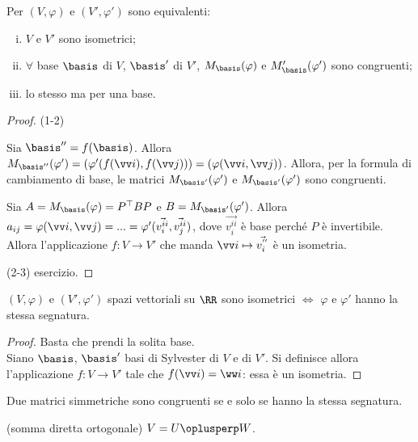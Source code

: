 \documentclass[11pt]{article}
\begin{document}
	\begin{proposition}
		Per $(V, \varphi)$ e $(V', \varphi')$ sono equivalenti:
		
		\begin{enumerate}[(i)]
			\item $V$ e $V'$ sono isometrici;
			\item $\forall$ base $\basis$ di $V$, $\basis'$ di $V'$,
			$M_\basis(\varphi)$ e $M_\basis'(\varphi')$ sono congruenti;
			\item lo stesso ma per una base.
		\end{enumerate}
	\end{proposition}

	\begin{proof}
		(1-2)
		
		 \rightproof Sia $\basis'' = f(\basis)$. Allora $M_{\basis''}(\varphi')=
		 (\varphi'(f(\vv i), f(\vv j))) = (\varphi(\vv i, \vv j))$. Allora,
		 per la formula di cambiamento di base, le matrici
		 $M_{\basis'}(\varphi')$ e $M_{\basis'}(\varphi')$ sono congruenti.
		 
		 \leftproof Sia $A = M_\basis(\varphi) = P^\top B P$ e
		 $B = M_{\basis'}(\varphi')$. Allora $a_{ij} = \varphi(\vv i, \vv j) =
		 ... = \varphi'(\vec{v_i^{ii}}, \vec{v_j^{ii}})$, dove
		 $\vec{v_i^{ii}}$ è base perché $P$ è invertibile. Allora
		 l'applicazione $f : V \to V'$ che manda $\vv i \mapsto \vec{v_{i}^{''}}$ è un isometria.
		 
		 (2-3) esercizio.
	\end{proof}

	\begin{proposition} $(V, \varphi)$ e $(V', \varphi')$ spazi vettoriali
		su $\RR$ sono
		isometrici $\iff$ $\varphi$ e $\varphi'$ hanno la stessa segnatura.
	\end{proposition}

	\begin{proof}
		\rightproof Basta che prendi la solita base. \\
		\leftproof Siano $\basis$, $\basis'$ basi di Sylvester di $V$
		e di $V'$. Si definisce allora l'applicazione $f : V \to V'$ tale
		che $f(\vv i) = \ww i$: essa è un isometria.
	\end{proof}

	\begin{corollary}
		Due matrici simmetriche sono congruenti se e solo se hanno
		la stessa segnatura.
	\end{corollary}

	\begin{definition} (somma diretta ortogonale)
		$V = U \oplusperp W$.
	\end{definition}
\end{document}
